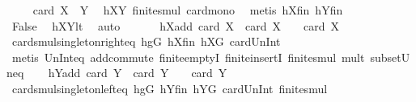 \begin{isabellebody}
\ \isamarkupfalse%
\ {\isachardoublequoteopen}{\isachardot}{\kern0pt}{\isachardot}{\kern0pt}{\isachardot}{\kern0pt}\ {\isasymle}\ card\ {\isacharparenleft}{\kern0pt}X\ {\isasymcdots}\ Y{\isacharparenright}{\kern0pt}{\isachardoublequoteclose}\ \isamarkupfalse%
\ hXY{}\ finite{\isacharunderscore}{\kern0pt}smul\ card{\isacharunderscore}{\kern0pt}mono\ \isamarkupfalse%
\ {\isacharparenleft}{\kern0pt}metis\ hXfin\ hYfin{\isacharparenright}{\kern0pt}\isanewline
\ \ \ \ \isamarkupfalse%
\ \isamarkupfalse%
\ False\ \isamarkupfalse%
\ hXYlt\ \isamarkupfalse%
\ auto\isanewline
\ \ \isamarkupfalse%
\isanewline
\ \ \isamarkupfalse%
\ hXadd{\isacharcolon}{\kern0pt}\ {\isachardoublequoteopen}card\ {\isacharquery}{\kern0pt}X{}\ {\isacharplus}{\kern0pt}\ card\ {\isacharquery}{\kern0pt}X{}\ {\isacharequal}{\kern0pt}\ {}\ {\isacharasterisk}{\kern0pt}\ card\ X{\isachardoublequoteclose}\ \isanewline
\ \ \ \ \isamarkupfalse%
\ card{\isacharunderscore}{\kern0pt}smul{\isacharunderscore}{\kern0pt}singleton{\isacharunderscore}{\kern0pt}right{\isacharunderscore}{\kern0pt}eq\ hgG\ hXfin\ hXG\ card{\isacharunderscore}{\kern0pt}Un{\isacharunderscore}{\kern0pt}Int\isanewline
\ \ \ \ \isamarkupfalse%
\ {\isacharparenleft}{\kern0pt}metis\ Un{\isacharunderscore}{\kern0pt}Int{\isacharunderscore}{\kern0pt}eq{\isacharparenleft}{\kern0pt}{}{\isacharparenright}{\kern0pt}\ add{\isachardot}{\kern0pt}commute\ finite{\isachardot}{\kern0pt}emptyI\ finite{\isachardot}{\kern0pt}insertI\ finite{\isacharunderscore}{\kern0pt}smul\ mult{\isacharunderscore}{\kern0pt}{}\ subset{\isacharunderscore}{\kern0pt}Un{\isacharunderscore}{\kern0pt}eq{\isacharparenright}{\kern0pt}\isanewline
\ \ \isamarkupfalse%
\ hYadd{\isacharcolon}{\kern0pt}\ {\isachardoublequoteopen}card\ {\isacharquery}{\kern0pt}Y{}\ {\isacharplus}{\kern0pt}\ card\ {\isacharquery}{\kern0pt}Y{}\ {\isacharequal}{\kern0pt}\ {}\ {\isacharasterisk}{\kern0pt}\ card\ Y{\isachardoublequoteclose}\isanewline
\ \ \ \ \isamarkupfalse%
\ card{\isacharunderscore}{\kern0pt}smul{\isacharunderscore}{\kern0pt}singleton{\isacharunderscore}{\kern0pt}left{\isacharunderscore}{\kern0pt}eq\ hgG\ hYfin\ hYG\ card{\isacharunderscore}{\kern0pt}Un{\isacharunderscore}{\kern0pt}Int\ finite{\isacharunderscore}{\kern0pt}smul\isanewline
\ \ \ \ \isamarkupfalse%

\end{isabellebody}
